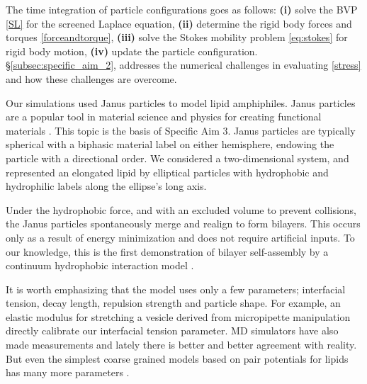 The time integration of particle configurations goes as follows: 
\textbf{(i)} solve the BVP \eqref{SL} for the screened Laplace equation, 
\textbf{(ii)} determine the rigid body forces and torques \eqref{forceandtorque}, 
\textbf{(iii)} solve the Stokes mobility problem \eqref{eq:stokes} for rigid body motion,
\textbf{(iv)} update the particle configuration. 
\S \ref{subsec:specific_aim_2}, addresses the numerical challenges in 
evaluating \eqref{stress} and how these challenges are overcome. 



Our simulations used Janus particles to model
lipid amphiphiles. Janus particles are a popular tool in material science and physics
for creating functional materials \cite{Lee2014, Lee2013}. 
This topic is the basis of Specific Aim 3. Janus particles are typically
spherical with a biphasic material label on either hemisphere,  endowing the particle
with a directional order. We considered a two-dimensional system, and represented an 
elongated lipid by elliptical particles with hydrophobic and hydrophilic labels along the ellipse's long axis. 

Under the hydrophobic force, and with an excluded volume to prevent collisions, the 
Janus particles spontaneously merge and realign to form bilayers. This occurs only as a result
of energy minimization and does not require artificial inputs. To our knowledge, this is the first demonstration 
of bilayer self-assembly by a continuum hydrophobic interaction model \cite{Noguchi2001,Farago2003,Brannigan2006,Brooks2009,Wang2013}.  

It is worth emphasizing that the model uses only a few parameters; interfacial tension, decay length, repulsion strength and particle
shape. For example, an elastic modulus for stretching a vesicle derived from micropipette manipulation 
directly calibrate our interfacial tension parameter. 
MD simulators have also made measurements and lately there is better and better agreement with reality. 
But even the simplest coarse grained models based on pair potentials for lipids has many more parameters \cite{Varilly2011,Wang2013} . 

